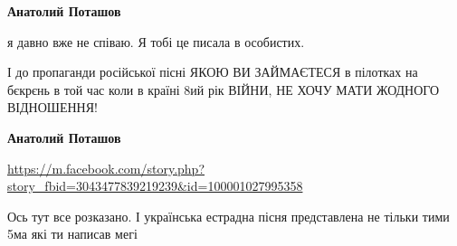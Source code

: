 \begin{itemize}
\begin{itemize}
\begin{itemize}
\textbf{Анатолий Поташов} 

я давно вже не співаю. Я тобі це писала в особистих.

І до пропаганди російської пісні ЯКОЮ ВИ ЗАЙМАЄТЕСЯ в пілотках на бєкрєнь в той
час коли в країні 8ий рік ВІЙНИ, НЕ ХОЧУ МАТИ ЖОДНОГО ВІДНОШЕННЯ!


 
\textbf{Анатолий Поташов} 

\url{https://m.facebook.com/story.php?story_fbid=3043477839219239&id=100001027995358}

Ось тут все розказано. І українська естрадна пісня представлена не тільки тими 5ма які ти написав мегі

\end{itemize}	

\end{itemize}

\end{itemize}

